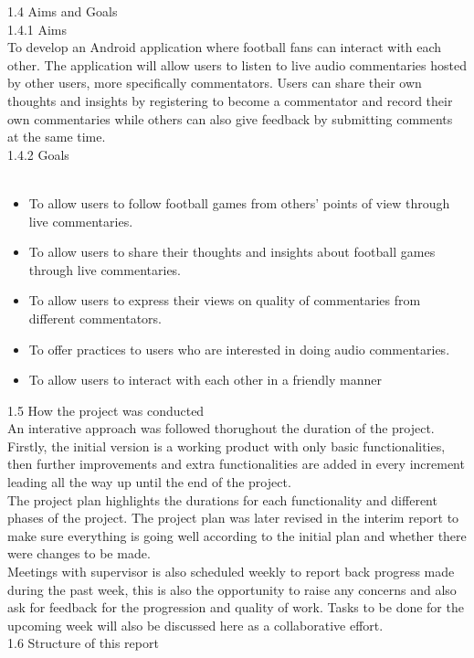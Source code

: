 \documentclass{article}
\begin{document}
\begin{flushleft}
{\Large 1.4 Aims and Goals}\\
{\large 1.4.1 Aims}\\
To develop an Android application where football fans can interact with each other. The application will allow users to listen to live audio commentaries hosted by other users, more specifically commentators. Users can share their own thoughts and insights by registering to become a commentator and record their own commentaries while others can also give feedback by submitting comments at the same time.\\
{\large 1.4.2 Goals}\\\
\begin{itemize}
	\item To allow users to follow football games from others’ points of view through live commentaries.
	\item To allow users to share their thoughts and insights about football games through live commentaries.
	\item To allow users to express their views on quality of commentaries from different commentators.
	\item To offer practices to users who are interested in doing audio commentaries.
	\item To allow users to interact with each other in a friendly manner
\end{itemize}
{\Large 1.5 How the project was conducted}\\
An interative approach was followed thorughout the duration of the project. Firstly, the initial version is a working product with only basic functionalities, then further improvements and extra functionalities are added in every increment leading all the way up until the end of the project.\\
The project plan highlights the durations for each functionality and different phases of the project. The project plan was later revised in the interim report to make sure everything is going well according to the initial plan and whether there were changes to be made.\\
Meetings with supervisor is also scheduled weekly to report back progress made during the past week, this is also the opportunity to raise any concerns and also ask for feedback for the progression and quality of work. Tasks to be done for the upcoming week will also be discussed here as a collaborative effort.\\
{\Large 1.6 Structure of this report}\\

\end{flushleft}
\end{document}
